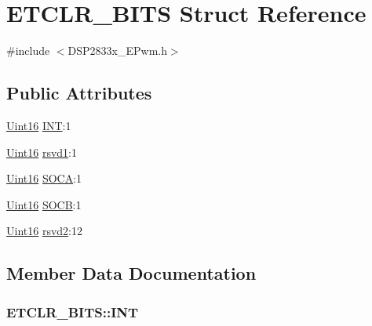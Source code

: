 \hypertarget{struct_e_t_c_l_r___b_i_t_s}{}\section{E\+T\+C\+L\+R\+\_\+\+B\+I\+T\+S Struct Reference}
\label{struct_e_t_c_l_r___b_i_t_s}


{\ttfamily \#include $<$D\+S\+P2833x\+\_\+\+E\+Pwm.\+h$>$}

\subsection*{Public Attributes}
\begin{DoxyCompactItemize}
\item 
\hyperlink{_d_s_p2833x___device_8h_a59a9f6be4562c327cbfb4f7e8e18f08b}{Uint16} \hyperlink{struct_e_t_c_l_r___b_i_t_s_a436e99aac7a04b606cf7e1c90e298a6c}{I\+N\+T}\+:1
\item 
\hyperlink{_d_s_p2833x___device_8h_a59a9f6be4562c327cbfb4f7e8e18f08b}{Uint16} \hyperlink{struct_e_t_c_l_r___b_i_t_s_a582c71a711e4b704d259ab256b9677d0}{rsvd1}\+:1
\item 
\hyperlink{_d_s_p2833x___device_8h_a59a9f6be4562c327cbfb4f7e8e18f08b}{Uint16} \hyperlink{struct_e_t_c_l_r___b_i_t_s_a3922cb8e413915cb0eff6138c5fdfe80}{S\+O\+C\+A}\+:1
\item 
\hyperlink{_d_s_p2833x___device_8h_a59a9f6be4562c327cbfb4f7e8e18f08b}{Uint16} \hyperlink{struct_e_t_c_l_r___b_i_t_s_a025a3c7cd5ed79701addf5fb90990176}{S\+O\+C\+B}\+:1
\item 
\hyperlink{_d_s_p2833x___device_8h_a59a9f6be4562c327cbfb4f7e8e18f08b}{Uint16} \hyperlink{struct_e_t_c_l_r___b_i_t_s_a262c31e7a22f46dab5bfb74f104c9aec}{rsvd2}\+:12
\end{DoxyCompactItemize}


\subsection{Member Data Documentation}
\hypertarget{struct_e_t_c_l_r___b_i_t_s_a436e99aac7a04b606cf7e1c90e298a6c}{}
\subsubsection[{I\+N\+T}]{ E\+T\+C\+L\+R\+\_\+\+B\+I\+T\+S\+::\+I\+N\+T}\label{struct_e_t_c_l_r___b_i_t_s_a436e99aac7a04b606cf7e1c90e298a6c}
\hypertarget{struct_e_t_c_l_r___b_i_t_s_a582c71a711e4b704d259ab256b9677d0}{}
